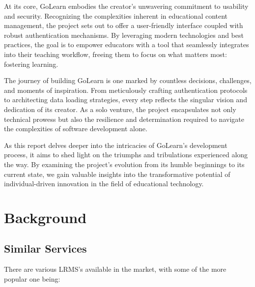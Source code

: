 \documentclass[11pt, a4paper,twoside]{report}
\theoremstyle{plain} %
\theoremstyle{definition} %
\numberwithin{equation}{chapter}
\begin{document}
At its core, GoLearn embodies the creator's unwavering commitment to usability
and security. Recognizing the complexities inherent in educational content
management, the project sets out to offer a user-friendly interface coupled
with robust authentication mechanisms. By leveraging modern technologies and
best practices, the goal is to empower educators with a tool that seamlessly
integrates into their teaching workflow, freeing them to focus on what matters
most: fostering learning.

The journey of building GoLearn is one marked by countless decisions,
challenges, and moments of inspiration. From meticulously crafting
authentication protocols to architecting data loading strategies, every step
reflects the singular vision and dedication of its creator. As a solo venture,
the project encapsulates not only technical prowess but also the resilience and
determination required to navigate the complexities of software development
alone.

As this report delves deeper into the intricacies of GoLearn's development
process, it aims to shed light on the triumphs and tribulations experienced
along the way. By examining the project's evolution from its humble beginnings
to its current state, we gain valuable insights into the transformative
potential of individual-driven innovation in the field of educational
technology.


\chapter{Background}\label{ch:background}

\section{Similar Services}\label{sec:similarservices}

There are various LRMS's available in the market, with some of the more popular
one being:
\end{document}
